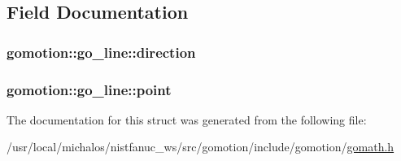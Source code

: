 \subsection{Field Documentation}
\hypertarget{structgomotion_1_1go__line_ae6dce3a84c609e8ef3c3d97b8a5bc0ab}{
\subsubsection[{direction}]{ gomotion\-::go\-\_\-line\-::direction}}\label{structgomotion_1_1go__line_ae6dce3a84c609e8ef3c3d97b8a5bc0ab}
\hypertarget{structgomotion_1_1go__line_a074cee7c1f473ac10092e38e3f73699e}{
\subsubsection[{point}]{ gomotion\-::go\-\_\-line\-::point}}\label{structgomotion_1_1go__line_a074cee7c1f473ac10092e38e3f73699e}


The documentation for this struct was generated from the following file\-:\begin{DoxyCompactItemize}
\item 
/usr/local/michalos/nistfanuc\-\_\-ws/src/gomotion/include/gomotion/\hyperlink{gomath_8h}{gomath.\-h}\end{DoxyCompactItemize}
